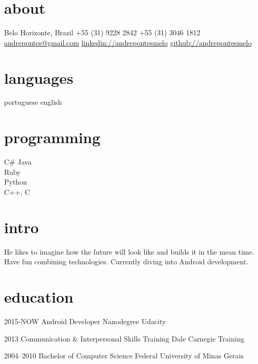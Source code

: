 \documentclass[]{friggeri-cv}
\begin{document}


\begin{aside} 
\section{about}
Belo Horizonte, Brazil
+55 (31) 9228 2842
+55 (31) 3046 1812
~
\href{mailto:andrepontes@gmail.com}{andrepontes@gmail.com}
\href{https://br.linkedin.com/in/andrepontesmelo}{linkedin://andrepontesmelo}
\href{https://github.com/andrepontesmelo}{github://andrepontesmelo}
\section{languages}
portuguese
english
\section{programming}
C\#
Java\\Ruby\\Python\\C++, C
\end{aside}

\section{intro}
He likes to imagine how the future will look like and builds it in the mean time. Have fun combining technologies. Currently diving into Android development. 


\section{education}

\begin{entrylist}
\entry
{2015-NOW}
{Android {\normalfont Developer Nanodegree}}
{Udacity}


\entry
{2013}
{Communication \& Interpersonal {\normalfont Skills Training}}
{Dale Carnegie Training}

\entry
{2004--2010}
{{\normalfont Bachelor of} Computer Science}
{Federal University of Minas Gerais}

\end{entrylist}
\end{document}
